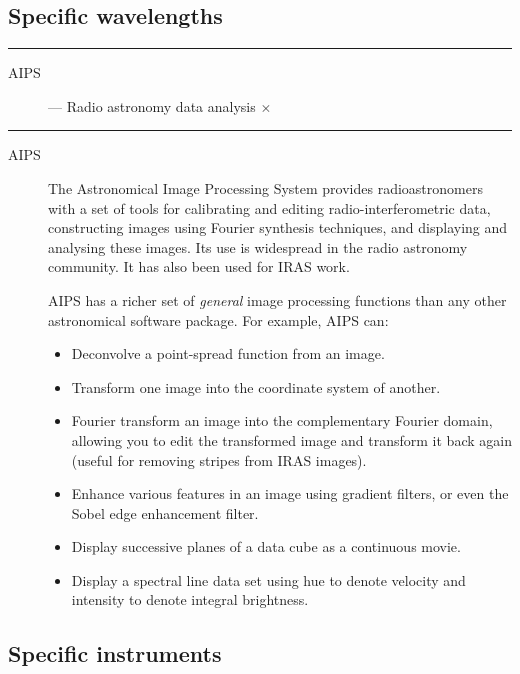 \subsection{Specific wavelengths}

\rule{\textwidth}{0.5mm}
\begin{description}
\begin{description}
\item [AIPS] --- Radio astronomy data analysis \hfill $\times$
\end{description}
\end{description}
\rule{\textwidth}{0.5mm}

\begin{description}

\item [AIPS] \mbox{}

The Astronomical Image Processing System provides radioastronomers with
a set of tools for calibrating and editing radio-interferometric data,
constructing images using Fourier synthesis techniques, and displaying and
analysing these images.
Its use is widespread in the radio astronomy community.
It has also been used for IRAS work.

AIPS has a richer set of {\em general} image processing functions than any
other astronomical software package.
For example, AIPS can:
\begin{itemize}
\item Deconvolve a point-spread function from an image.
\item Transform one image into the coordinate system of another.
\item Fourier transform an image into the complementary Fourier domain,
 allowing you to edit the transformed image and transform it back again
 (useful for removing stripes from IRAS images).
\item Enhance various features in an image using gradient filters, or even the
 Sobel edge enhancement filter.
\item Display successive planes of a data cube as a continuous movie.
\item Display a spectral line data set using hue to denote velocity and
 intensity to denote integral brightness.
\end{itemize}

\end{description}

\newpage

\subsection{Specific instruments}

